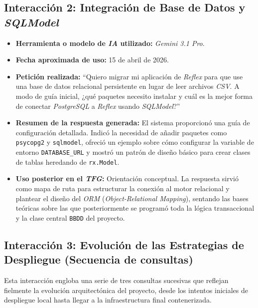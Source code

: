\subsection{Interacción 2: Integración de Base de Datos y \textit{SQLModel}}
\begin{itemize}
    \item \textbf{Herramienta o modelo de \textit{IA} utilizado:} \textit{Gemini 3.1 Pro}.
    \item \textbf{Fecha aproximada de uso:} 15 de abril de 2026.
    \item \textbf{Petición realizada:} ``Quiero migrar mi aplicación de \textit{Reflex} para que use una base de datos relacional persistente en lugar de leer archivos \textit{CSV}. A modo de guía inicial, ¿qué paquetes necesito instalar y cuál es la mejor forma de conectar \textit{PostgreSQL} a \textit{Reflex} usando \textit{SQLModel}?''
    \item \textbf{Resumen de la respuesta generada:} El sistema proporcionó una guía de configuración detallada. Indicó la necesidad de añadir paquetes como \texttt{psycopg2} y \texttt{sqlmodel}, ofreció un ejemplo sobre cómo configurar la variable de entorno \texttt{DATABASE\_URL} y mostró un patrón de diseño básico para crear clases de tablas heredando de \texttt{rx.Model}.
    \item \textbf{Uso posterior en el \textit{TFG}:} Orientación conceptual. La respuesta sirvió como mapa de ruta para estructurar la conexión al motor relacional y plantear el diseño del \textit{ORM} (\textit{Object-Relational Mapping}), sentando las bases teóricas sobre las que posteriormente se programó toda la lógica transaccional y la clase central \texttt{BBDD} del proyecto.
\end{itemize}

\subsection{Interacción 3: Evolución de las Estrategias de Despliegue (Secuencia de consultas)}
Esta interacción engloba una serie de tres consultas sucesivas que reflejan fielmente la evolución arquitectónica del proyecto, desde los intentos iniciales de despliegue local hasta llegar a la infraestructura final contenerizada.

